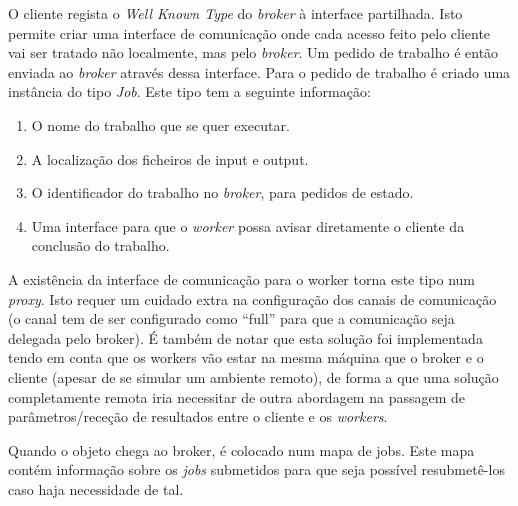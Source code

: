 \documentclass[a4paper]{article}
\begin{document}
O cliente regista o \emph{Well Known Type} do \emph{broker} à interface partilhada. Isto permite criar uma interface de comunicação onde cada acesso feito pelo cliente vai ser tratado não localmente, mas pelo \emph{broker}. Um pedido de trabalho é então enviada ao \emph{broker} através dessa interface.
Para o pedido de trabalho é criado uma instância do tipo \emph{Job}. Este tipo tem a seguinte informação:
\begin{enumerate}
\item O nome do trabalho que se quer executar.
\item A localização dos ficheiros de input e output.
\item O identificador do trabalho no \emph{broker}, para pedidos de estado.
\item Uma interface para que o \emph{worker} possa avisar diretamente o cliente da conclusão do trabalho.
\end{enumerate}

A existência da interface de comunicação para o worker torna este tipo num \emph{proxy}. Isto requer um cuidado extra na configuração dos canais de comunicação (o canal tem de ser configurado como "`full"' para que a comunicação seja delegada pelo broker). É também de notar que esta solução foi implementada tendo em conta que os workers vão estar na mesma máquina que o broker e o cliente (apesar de se simular um ambiente remoto), de forma a que uma solução completamente remota iria necessitar de outra abordagem na passagem de parâmetros/receção de resultados entre o cliente e os \emph{workers}.

Quando o objeto chega ao broker, é colocado num mapa de jobs. Este mapa contém informação sobre os \emph{jobs} submetidos para que seja possível resubmetê-los caso haja necessidade de tal.
\end{document}
